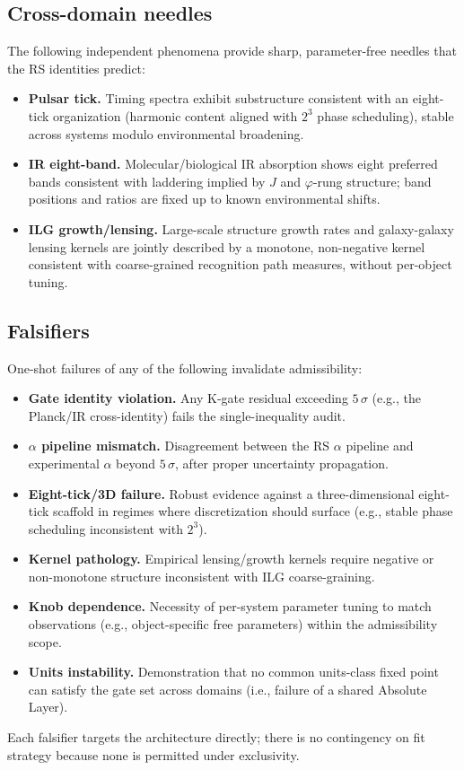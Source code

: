 \documentclass[11pt]{article}
\begin{document}
\subsection{Cross\mbox{-}domain needles}
The following independent phenomena provide sharp, parameter\mbox{-}free needles that the RS identities predict:
\begin{itemize}
  \item \textbf{Pulsar tick.} Timing spectra exhibit substructure consistent with an eight\mbox{-}tick organization (harmonic content aligned with \(2^3\) phase scheduling), stable across systems modulo environmental broadening.
  \item \textbf{IR eight\mbox{-}band.} Molecular/biological IR absorption shows eight preferred bands consistent with laddering implied by \(J\) and \(\varphi\)\mbox{-}rung structure; band positions and ratios are fixed up to known environmental shifts.
  \item \textbf{ILG growth/lensing.} Large\mbox{-}scale structure growth rates and galaxy\mbox{-}galaxy lensing kernels are jointly described by a monotone, non\mbox{-}negative kernel consistent with coarse\mbox{-}grained recognition path measures, without per\mbox{-}object tuning.
\end{itemize}

\subsection{Falsifiers}
One\mbox{-}shot failures of any of the following invalidate admissibility:
\begin{itemize}
  \item \textbf{Gate identity violation.} Any K\mbox{-}gate residual exceeding \(5\,\sigma\) (e.g., the Planck/IR cross\mbox{-}identity) fails the single\mbox{-}inequality audit.
  \item \textbf{\(\alpha\) pipeline mismatch.} Disagreement between the RS \(\alpha\) pipeline and experimental \(\alpha\) beyond \(5\,\sigma\), after proper uncertainty propagation.
  \item \textbf{Eight\mbox{-}tick/3D failure.} Robust evidence against a three\mbox{-}dimensional eight\mbox{-}tick scaffold in regimes where discretization should surface (e.g., stable phase scheduling inconsistent with \(2^3\)).
  \item \textbf{Kernel pathology.} Empirical lensing/growth kernels require negative or non\mbox{-}monotone structure inconsistent with ILG coarse\mbox{-}graining.
  \item \textbf{Knob dependence.} Necessity of per\mbox{-}system parameter tuning to match observations (e.g., object\mbox{-}specific free parameters) within the admissibility scope.
  \item \textbf{Units instability.} Demonstration that no common units\mbox{-}class fixed point can satisfy the gate set across domains (i.e., failure of a shared Absolute Layer).
\end{itemize}
Each falsifier targets the architecture directly; there is no contingency on fit strategy because none is permitted under exclusivity.
\end{document}
